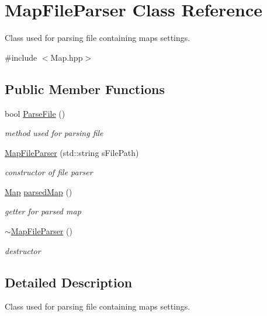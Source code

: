 \hypertarget{class_map_file_parser}{}\section{Map\+File\+Parser Class Reference}
\label{class_map_file_parser}


Class used for parsing file containing map\textquotesingle{}s settings.  




{\ttfamily \#include $<$Map.\+hpp$>$}

\subsection*{Public Member Functions}
\begin{DoxyCompactItemize}
\item 
bool \mbox{\hyperlink{class_map_file_parser_a763133f44741dc4164595d03df036d0b}{Parse\+File}} ()
\begin{DoxyCompactList}\small\item\em method used for parsing file \end{DoxyCompactList}\item 
\mbox{\hyperlink{class_map_file_parser_a650246d5b95af369b885615c6b7d61bf}{Map\+File\+Parser}} (std\+::string s\+File\+Path)
\begin{DoxyCompactList}\small\item\em constructor of file parser \end{DoxyCompactList}\item 
\mbox{\hyperlink{class_map}{Map}} \mbox{\hyperlink{class_map_file_parser_a4c6fa40ab985db21869eecdcdba62549}{parsed\+Map}} ()
\begin{DoxyCompactList}\small\item\em getter for parsed map \end{DoxyCompactList}\item 
\mbox{\label{class_map_file_parser_a897daf88843f2c6ce2549ccc22f932b9}} 
\mbox{\hyperlink{class_map_file_parser_a897daf88843f2c6ce2549ccc22f932b9}{$\sim$\+Map\+File\+Parser}} ()
\begin{DoxyCompactList}\small\item\em destructor \end{DoxyCompactList}\end{DoxyCompactItemize}


\subsection{Detailed Description}
Class used for parsing file containing map\textquotesingle{}s settings. 

